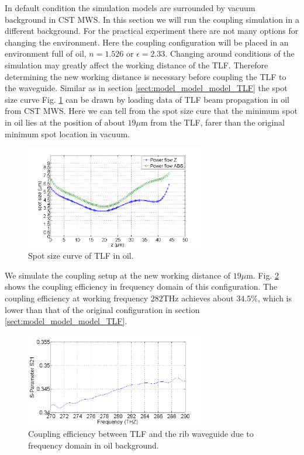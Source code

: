 In default condition the simulation models are surrounded by vacuum background in CST MWS.
In this section we will run the coupling simulation in a different background. For the practical experiment there are not many options for changing the environment. Here the coupling configuration will be placed in an environment full of oil, $n=1.526$ or $\epsilon=2.33$. Changing around conditions of the simulation may greatly affect the working distance of the TLF. Therefore determining the new working distance is necessary before coupling the TLF to the waveguide.  Similar as in section \ref{sect:model_model_model_TLF} the spot size curve Fig. \ref{fig:oil_spot_curve} can be drawn by loading data of TLF beam propagation in oil from CST MWS. Here we can tell from the spot size cure that the minimum spot in oil lies at the position of about $19\mu$m from the TLF, farer than the original minimum spot location in vacuum.\\    
\begin{figure}[!ht]
\centering
\includegraphics[width=0.7\textwidth]{bilder/spot_curve_oil}
\caption{Spot size curve of TLF in oil.}
\label{fig:oil_spot_curve}
\end{figure}
We simulate the coupling setup at the new working distance of $19\mu$m. Fig. \ref{fig:oil_coupling_curve} shows the coupling efficiency in frequency domain of this configuration. The coupling efficiency at working frequency $282$THz achieves about $34.5\%$, which is lower than that of the original configuration in section \ref{sect:model_model_model_TLF}.
\begin{figure}[!ht]
\centering
\includegraphics[width=0.7\textwidth]{bilder/s21_oil_curve}
\caption{Coupling efficiency between TLF and the rib waveguide due to frequency domain in oil background.}
\label{fig:oil_coupling_curve}
\end{figure}
